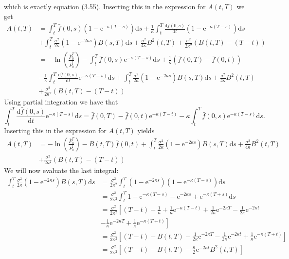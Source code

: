 \documentclass[12pt,twoside]{reedthesis}
\begin{document}
which is exactly equation (3.55). Inserting this in the expression for \(A(t, T)\) we get
\[
\begin{aligned}
A(t, T) &=\int_{t}^{T} \bar{f}(0, s)\left(1-\mathrm{e}^{-\kappa(T-s)}\right) \mathrm{d} s+\frac{1}{\kappa} \int_{t}^{T} \frac{\mathrm{d} \bar{f}(0, s)}{\mathrm{d} t}\left(1-\mathrm{e}^{-\kappa(T-s)}\right) \mathrm{d} s \\
&+\int_{t}^{T} \frac{\sigma^{2}}{2 \kappa}\left(1-\mathrm{e}^{-2 \kappa s}\right) B(s, T) \mathrm{d} s+\frac{\sigma^{2}}{4 \kappa} B^{2}(t, T)+\frac{\sigma^{2}}{2 \kappa^{2}}(B(t, T)-(T-t)) \\
&=-\ln \left(\frac{\bar{P}_{0}^{T}}{\bar{P}_{0}^{t}}\right)-\int_{t}^{T} \bar{f}(0, s) \mathrm{e}^{-\kappa(T-s)} \mathrm{d} s+\frac{1}{\kappa}(\bar{f}(0, T)-\bar{f}(0, t)) \\
&-\frac{1}{\kappa} \int_{t}^{T} \frac{\mathrm{d} \bar{f}(0, s)}{\mathrm{d} t} \mathrm{e}^{-\kappa(T-s)} \mathrm{d} s+\int_{t}^{T} \frac{\sigma^{2}}{2 \kappa}\left(1-\mathrm{e}^{-2 \kappa s}\right) B(s, T) \mathrm{d} s+\frac{\sigma^{2}}{4 \kappa} B^{2}(t, T) \\
&+\frac{\sigma^{2}}{2 \kappa^{2}}(B(t, T)-(T-t))
\end{aligned}
\]
Using partial integration we have that
\[
\int_{t}^{T} \frac{\mathrm{d} \bar{f}(0, s)}{\mathrm{d} t} \mathrm{e}^{-\kappa(T-s)} \mathrm{d} s=\bar{f}(0, T)-\bar{f}(0, t) \mathrm{e}^{-\kappa(T-t)}-\kappa \int_{t}^{T} \bar{f}(0, s) \mathrm{e}^{-\kappa(T-s)} \mathrm{d} s .
\]
Inserting this in the expression for \(A(t, T)\) yields
\[
\begin{aligned}
A(t, T) &=-\ln \left(\frac{\bar{P}_{0}^{T}}{P_{0}^{t}}\right)-B(t, T) \bar{f}(0, t)+\int_{t}^{T} \frac{\sigma^{2}}{2 \kappa}\left(1-\mathrm{e}^{-2 \kappa s}\right) B(s, T) \mathrm{d} s+\frac{\sigma^{2}}{4 \kappa} B^{2}(t, T) \\
&+\frac{\sigma^{2}}{2 \kappa^{2}}(B(t, T)-(T-t))
\end{aligned}
\]
We will now evaluate the last integral:
\[
\begin{aligned}
\int_{t}^{T} \frac{\sigma^{2}}{2 \kappa}\left(1-\mathrm{e}^{-2 \kappa s}\right) B(s, T) \mathrm{d} s &=\frac{\sigma^{2}}{2 \kappa^{2}} \int_{t}^{T}\left(1-\mathrm{e}^{-2 \kappa s}\right)\left(1-\mathrm{e}^{-\kappa(T-s)}\right) \mathrm{d} s \\
&=\frac{\sigma^{2}}{2 \kappa^{2}} \int_{t}^{T} 1-\mathrm{e}^{-\kappa(T-s)}-\mathrm{e}^{-2 \kappa s}+\mathrm{e}^{-\kappa(T+s)} \mathrm{d} s \\
&=\frac{\sigma^{2}}{2 \kappa^{2}}\left[(T-t)-\frac{1}{\kappa}+\frac{1}{\kappa} \mathrm{e}^{-\kappa(T-t)}+\frac{1}{2 \kappa} \mathrm{e}^{-2 \kappa T}-\frac{1}{2 \kappa} \mathrm{e}^{-2 \kappa t}\right.\\
&\left.-\frac{1}{\kappa} \mathrm{e}^{-2 \kappa T}+\frac{1}{\kappa} \mathrm{e}^{-\kappa(T+t)}\right] \\
&=\frac{\sigma^{2}}{2 \kappa^{2}}\left[(T-t)-B(t, T)-\frac{1}{2 \kappa} \mathrm{e}^{-2 \kappa T}-\frac{1}{2 \kappa} \mathrm{e}^{-2 \kappa t}+\frac{1}{\kappa} \mathrm{e}^{-\kappa(T+t)}\right] \\
&=\frac{\sigma^{2}}{2 \kappa^{2}}\left[(T-t)-B(t, T)-\frac{\kappa}{2} \mathrm{e}^{-2 \kappa t} B^{2}(t, T)\right]
\end{aligned}
\]
\end{document}
